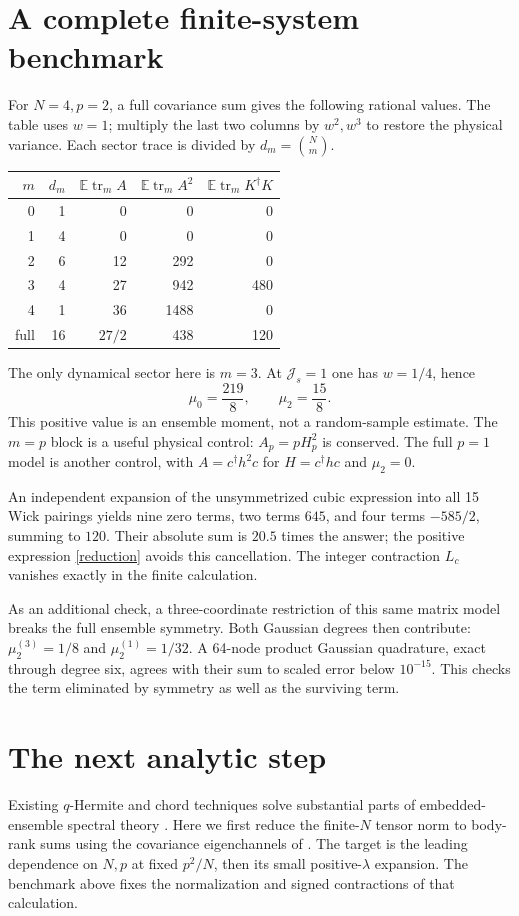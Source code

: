 \documentclass[11pt,a4paper]{article}
\newcommand{\tr}{\operatorname{tr}}
\newcommand{\E}{\mathbb E}
\begin{document}
\newpage
\section{A complete finite-system benchmark}
For $N=4,p=2$, a full covariance sum gives the following rational values.
The table uses $w=1$; multiply the last two columns by $w^2,w^3$ to restore
the physical variance. Each sector trace is divided by $d_m=\binom Nm$.
\begin{center}
\begin{tabular}{rrrrr}\toprule
$m$ & $d_m$ & $\E\tr_m A$ & $\E\tr_m A^2$ & $\E\tr_m K^\dagger K$\\\midrule
0 & 1 & 0 & 0 & 0\\
1 & 4 & 0 & 0 & 0\\
2 & 6 & 12 & 292 & 0\\
3 & 4 & 27 & 942 & 480\\
4 & 1 & 36 & 1488 & 0\\\midrule
full & 16 & $27/2$ & 438 & 120\\\bottomrule
\end{tabular}
\end{center}
The only dynamical sector here is $m=3$. At $\mathcal J_s=1$ one has
$w=1/4$, hence
\begin{equation}
 \mu_0=\frac{219}{8},\qquad \boxed{\mu_2=\frac{15}{8}}.
\end{equation}
This positive value is an ensemble moment, not a random-sample estimate.
The $m=p$ block is a useful physical control: $A_p=pH_p^2$ is conserved.
The full $p=1$ model is another control, with
$A=c^\dagger h^2c$ for $H=c^\dagger hc$ and $\mu_2=0$.

An independent expansion of the unsymmetrized cubic expression into all
15 Wick pairings yields nine zero terms, two terms $645$, and four terms
$-585/2$, summing to $120$. Their absolute sum is $20.5$ times the
answer; the positive expression \eqref{reduction} avoids this cancellation.
The integer contraction $L_c$ vanishes exactly in the finite calculation.

As an additional check, a three-coordinate restriction of this same
matrix model breaks the full ensemble symmetry. Both Gaussian degrees
then contribute: $\mu_2^{(3)}=1/8$ and $\mu_2^{(1)}=1/32$.
A 64-node product Gaussian quadrature, exact through degree six, agrees
with their sum to scaled error below $10^{-15}$. This checks the term
eliminated by symmetry as well as the surviving term.

\section{The next analytic step}
Existing $q$-Hermite and chord techniques solve substantial parts of
embedded-ensemble spectral theory \cite{tt}. Here we first reduce the
finite-$N$ tensor norm to body-rank sums using the covariance eigenchannels
of \cite{kota}. The target is the leading dependence on $N,p$ at fixed
$p^2/N$, then its small positive-$\lambda$ expansion. The benchmark above
fixes the normalization and signed contractions of that calculation.
\end{document}
